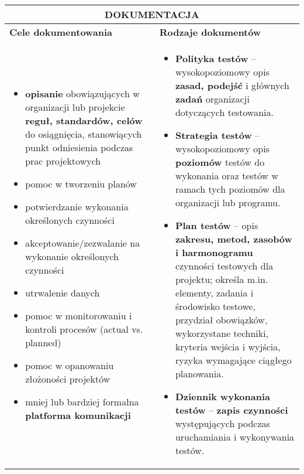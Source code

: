 \documentclass[../main.tex]{subfiles}
\begin{document}
    \begin{table}[H]
        \begin{center}
            \begin{tabular}{| p{8cm} | p{8cm} |}
                \hline
                \multicolumn{2}{|c|}{\textbf{DOKUMENTACJA}}\\
                \hline
                \hline
                \textbf{Cele dokumentowania} &  \textbf{Rodzaje dokumentów}\\
                \hline
                \begin{itemize}
                    \item \textbf{opisanie} obowiązujących w organizacji lub projekcie \textbf{reguł, standardów, celów} do osiągnięcia, stanowiących punkt odniesienia podczas prac projektowych
                    \item pomoc w tworzeniu planów
                    \item potwierdzanie wykonania określonych czynności
                    \item akceptowanie/zezwalanie na wykonanie określonych czynności
                    \item utrwalenie danych
                    \item pomoc w monitorowaniu i kontroli procesów (actual vs. planned)
                    \item pomoc w opanowaniu złożoności projektów
                    \item mniej lub bardziej formalna \textbf{platforma komunikacji}
                \end{itemize}
                &
                \begin{itemize}
                    \item \textbf{Polityka testów} – wysokopoziomowy opis \textbf{zasad, podejść} i głównych \textbf{zadań} organizacji dotyczących testowania.
                    \item \textbf{Strategia testów} – wysokopoziomowy opis \textbf{poziomów} testów do wykonania oraz testów w ramach tych poziomów dla organizacji lub programu.
                    \item \textbf{Plan testów} – opis \textbf{zakresu, metod, zasobów i harmonogramu} czynności testowych dla projektu; określa m.in. elementy, zadania i środowisko testowe, przydział obowiązków, wykorzystane techniki, kryteria wejścia i wyjścia, ryzyka wymagające ciągłego planowania.
                    \item \textbf{Dziennik wykonania testów} – \textbf{zapis czynności} występujących podczas uruchamiania i wykonywania testów.
                \end{itemize}\\
                \hline
            \end{tabular}
        \end{center}
    \end{table}
\end{document}
